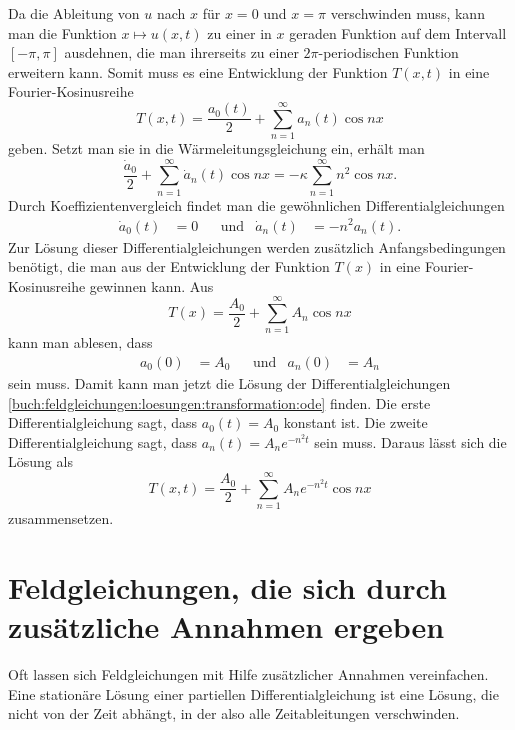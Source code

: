 Da die Ableitung von $u$ nach $x$ für $x=0$ und $x=\pi$ verschwinden
muss, kann man die Funktion $x\mapsto u(x,t)$ zu einer in $x$
geraden Funktion auf dem Intervall $[-\pi,\pi]$ ausdehnen, die
man ihrerseits zu einer $2\pi$-periodischen Funktion erweitern kann.
Somit muss es eine Entwicklung der Funktion $T(x,t)$ in
eine Fourier-Kosinusreihe
\[
T(x,t)
=
\frac{a_0(t)}{2}
+
\sum_{n=1}^\infty
a_n(t) \cos nx
\]
geben.
Setzt man sie in die Wärmeleitungsgleichung ein, erhält man
\[
\frac{\dot{a}_0}{2}
+
\sum_{n=1}^\infty
\dot{a}_n(t) \cos nx
=
-
\kappa
\sum_{n=1}^\infty
n^2
\cos nx.
\]
Durch Koeffizientenvergleich findet man die gewöhnlichen
Differentialgleichungen
\begin{align}
\dot{a}_0(t)&=0
&&\text{und}&
\dot{a}_n(t)&=-n^2 a_n(t).
\label{buch:feldgleichungen:loesungen:transformation:ode}
\end{align}
Zur Lösung dieser Differentialgleichungen werden zusätzlich
Anfangsbedingungen benötigt, die man aus der Entwicklung der
Funktion $T(x)$ in eine Fourier-Kosinusreihe gewinnen kann.
%
Aus 
\[
T(x)
=
\frac{A_0}2
+
\sum_{n=1}^\infty A_n \cos nx
\]
kann man ablesen, dass
\begin{align*}
a_0(0) &= A_0
&&\text{und}&
a_n(0) &= A_n
\end{align*}
sein muss.
Damit kann man jetzt die Lösung der Differentialgleichungen
\eqref{buch:feldgleichungen:loesungen:transformation:ode}
finden.
Die erste Differentialgleichung sagt, dass $a_0(t)=A_0$ konstant ist.
Die zweite Differentialgleichung sagt, dass $a_n(t) = A_ne^{-n^2t}$
sein muss.
Daraus lässt sich die Lösung als
\[
T(x,t)
=
\frac{A_0}{2}
+
\sum_{n=1}^\infty
A_n
e^{-n^2t}
\cos nx
\]
zusammensetzen.

%
%
\section{Feldgleichungen, die sich durch zusätzliche Annahmen ergeben}
Oft lassen sich Feldgleichungen mit Hilfe zusätzlicher Annahmen
vereinfachen.
Eine stationäre Lösung einer partiellen Differentialgleichung ist
eine Lösung, die nicht von der Zeit abhängt, in der also alle
Zeitableitungen verschwinden.


